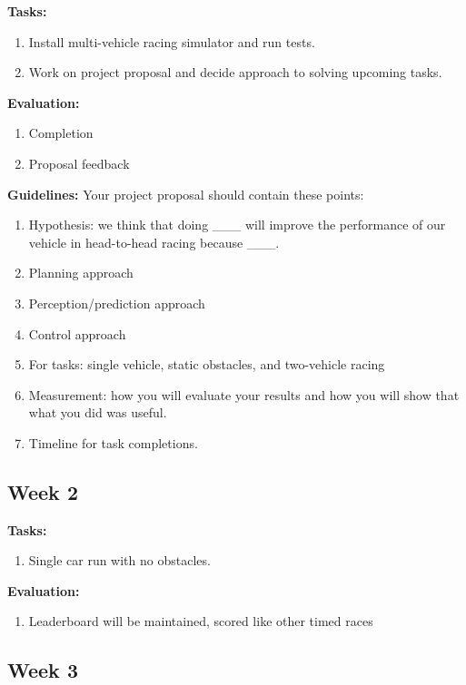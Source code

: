 \documentclass[letta4 paper]{article}
\numberwithin{equation}{section}
\newcommand{\0}{\mathbf{0}}
\begin{document}
	\textbf{Tasks: } \begin{enumerate}
		\item Install multi-vehicle racing simulator and run tests.
		\item Work on project proposal and decide approach to solving upcoming tasks.
	\end{enumerate}

	\noindent\textbf{Evaluation: } \begin{enumerate}
		\item Completion
		\item Proposal feedback
	\end{enumerate}

	\noindent\textbf{Guidelines: }Your project proposal should contain these points: \begin{enumerate}
		\item Hypothesis: we think that doing \_\_\_ will improve the performance of our vehicle in head-to-head racing because \_\_\_.
		\item Planning approach
		\item Perception/prediction approach
		\item Control approach
		\item For tasks: single vehicle, static obstacles, and two-vehicle racing
		\item Measurement: how you will evaluate your results and how you will show that what you did was useful.
		\item Timeline for task completions.
	\end{enumerate}

	\subsection{Week 2}
	
	\textbf{Tasks: } \begin{enumerate}
		\item Single car run with no obstacles.
	\end{enumerate}
	
	\noindent\textbf{Evaluation: } \begin{enumerate}
		\item Leaderboard will be maintained, scored like other timed races
	\end{enumerate}
	
	\subsection{Week 3}
	
\end{document}
